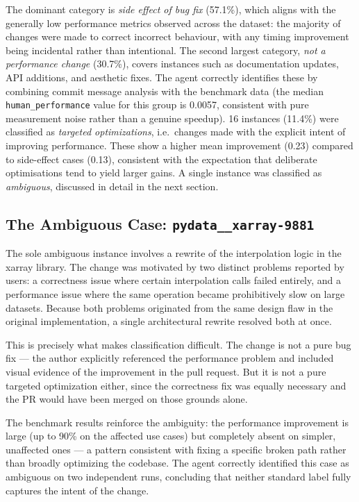 \documentclass[12pt, a4paper]{article}
\begin{document}
The dominant category is \textit{side effect of bug fix} (57.1\%), which aligns with the generally low performance metrics observed across the dataset: the majority of changes were made to correct incorrect behaviour, with any timing improvement being incidental rather than intentional.
The second largest category, \textit{not a performance change} (30.7\%), covers instances such as documentation updates, API additions, and aesthetic fixes. The agent correctly identifies these by combining commit message analysis with the benchmark data (the median \texttt{human\_performance} value for this group is 0.0057, consistent with pure measurement noise rather than a genuine speedup).
16 instances (11.4\%) were classified as \textit{targeted optimizations}, i.e.\ changes made with the explicit intent of improving performance. These show a higher mean improvement (0.23) compared to side-effect cases (0.13), consistent with the expectation that deliberate optimisations tend to yield larger gains.
A single instance was classified as \textit{ambiguous}, discussed in detail in the next section.

\subsection*{The Ambiguous Case: \texttt{pydata\_\_xarray-9881}}

The sole ambiguous instance involves a rewrite of the interpolation logic in the xarray library.
The change was motivated by two distinct problems reported by users: a correctness issue where certain interpolation calls failed entirely, and a performance issue where the same operation became prohibitively slow on large datasets.
Because both problems originated from the same design flaw in the original implementation, a single architectural rewrite resolved both at once.

This is precisely what makes classification difficult.
The change is not a pure bug fix — the author explicitly referenced the performance problem and included visual evidence of the improvement in the pull request.
But it is not a pure targeted optimization either, since the correctness fix was equally necessary and the PR would have been merged on those grounds alone.

The benchmark results reinforce the ambiguity: the performance improvement is large (up to 90\% on the affected use cases) but completely absent on simpler, unaffected ones — a pattern consistent with fixing a specific broken path rather than broadly optimizing the codebase.
The agent correctly identified this case as ambiguous on two independent runs, concluding that neither standard label fully captures the intent of the change.
\end{document}
